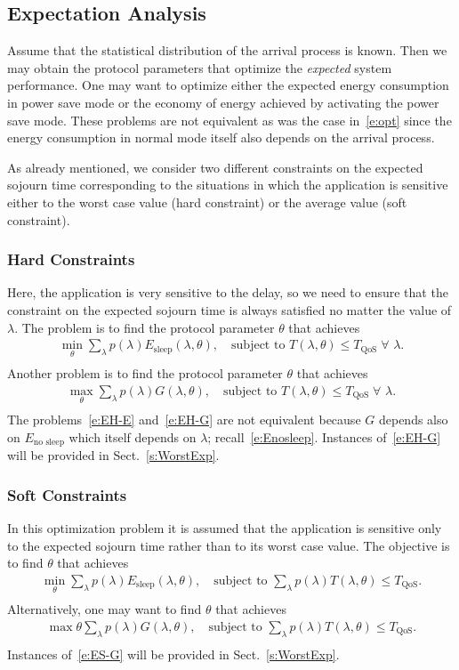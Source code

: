 \documentclass[journal]{IEEEtran}
\newcommand {\beq} {\begin{equation}}
\newcommand {\eeq} {\end{equation}}
\newcommand {\barr} {\begin{array}}
\newcommand {\earr} {\end{array}}
\begin{document}
\subsection{Expectation Analysis}
\label{s:exp}
Assume that the statistical distribution of the arrival process is known. Then we may obtain the protocol parameters that optimize the {\em expected} system performance. One may want to optimize either the
expected energy consumption in power save mode or the economy of energy achieved by activating the power save mode. These problems are not equivalent as was the case in~\eqref{e:opt} since the energy
consumption in normal mode itself also depends on the arrival process.

As already mentioned, we consider two different constraints on the expected sojourn time corresponding to the situations in which the application is sensitive either to the worst case value (hard constraint) or the average value (soft constraint). 
\subsubsection*{Hard Constraints}
Here, the application is very sensitive to the delay, so we need to ensure that the constraint on the expected sojourn time is always satisfied no matter the value of $\lambda$. The problem is to find the protocol parameter $\theta$ that achieves
\beq
\label{e:EH-E}
\barr{l}
\min_\theta \sum_\lambda p(\lambda)E_{\textrm{sleep}}(\lambda,\theta), \quad
\textrm{subject to } T(\lambda,\theta) \leq T_{\textrm{QoS}} \; \forall \,\,\lambda .\\
\earr
\eeq
Another problem is to find the protocol parameter $\theta$ that achieves
\beq
\label{e:EH-G}
\barr{l}
\max_\theta \sum_\lambda p(\lambda)G(\lambda,\theta) , \quad
\textrm{subject to } T(\lambda,\theta) \leq T_{\textrm{QoS}} \; \forall\,\, \lambda .\\
\earr
\eeq
The problems~\eqref{e:EH-E} and~\eqref{e:EH-G} are not equivalent
because $G$ depends also on $E_{\textrm{no sleep}}$ which itself
depends on $\lambda$; recall~\eqref{e:Enosleep}. Instances of~\eqref{e:EH-G}
will be provided in Sect.~\ref{s:WorstExp}.
\subsubsection*{Soft Constraints}
In this optimization problem it is assumed that the application is sensitive only to the expected sojourn time rather than to its worst case value. The objective is to find $\theta$ that achieves
\beq
\label{e:ES-E}
\barr{l}
\min_\theta \sum_\lambda p(\lambda)E_{\textrm{sleep}}(\lambda,\theta) , \quad
\textrm{subject to } \sum_\lambda p(\lambda) T(\lambda,\theta) \leq T_{\textrm{QoS}} .\\
\earr
\eeq
Alternatively, one may want to find $\theta$ that achieves
\beq
\label{e:ES-G}
\barr{l}
\max\theta \sum_\lambda p(\lambda)G(\lambda,\theta) , \quad
\textrm{subject to } \sum_\lambda p(\lambda) T(\lambda,\theta) \leq T_{\textrm{QoS}} .\\
\earr
\eeq
Instances of~\eqref{e:ES-G} will be provided in
Sect.~\ref{s:WorstExp}.
\end{document}
